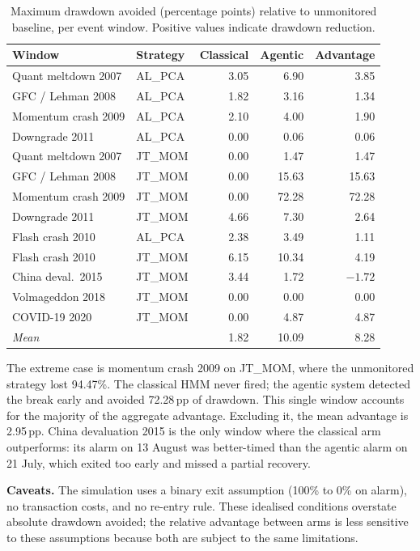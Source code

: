 \documentclass[11pt,a4paper]{article}
\begin{document}
\begin{table}[htbp]
\centering
\small
\caption{Maximum drawdown avoided (percentage points) relative to unmonitored
baseline, per event window. Positive values indicate drawdown reduction.}
\label{tab:pnl}
\begin{tabular}{llrrr}
\toprule
Window & Strategy & Classical & Agentic & Advantage \\
\midrule
Quant meltdown 2007  & AL\_PCA & 3.05 & 6.90 & 3.85 \\
GFC / Lehman 2008    & AL\_PCA & 1.82 & 3.16 & 1.34 \\
Momentum crash 2009  & AL\_PCA & 2.10 & 4.00 & 1.90 \\
Downgrade 2011       & AL\_PCA & 0.00 & 0.06 & 0.06 \\
\addlinespace
Quant meltdown 2007  & JT\_MOM & 0.00 & 1.47 & 1.47 \\
GFC / Lehman 2008    & JT\_MOM & 0.00 & 15.63 & 15.63 \\
Momentum crash 2009  & JT\_MOM & 0.00 & 72.28 & 72.28 \\
Downgrade 2011       & JT\_MOM & 4.66 & 7.30 & 2.64 \\
\addlinespace
Flash crash 2010     & AL\_PCA & 2.38 & 3.49 & 1.11 \\
Flash crash 2010     & JT\_MOM & 6.15 & 10.34 & 4.19 \\
China deval.\ 2015   & JT\_MOM & 3.44 & 1.72 & $-1.72$ \\
Volmageddon 2018     & JT\_MOM & 0.00 & 0.00 & 0.00 \\
COVID-19 2020        & JT\_MOM & 0.00 & 4.87 & 4.87 \\
\midrule
\multicolumn{2}{l}{\emph{Mean}} & 1.82 & 10.09 & 8.28 \\
\bottomrule
\end{tabular}
\end{table}

The extreme case is momentum crash 2009 on JT\_MOM, where the unmonitored
strategy lost 94.47\%. The classical HMM never fired; the agentic system
detected the break early and avoided 72.28\,pp of drawdown. This single
window accounts for the majority of the aggregate advantage. Excluding it,
the mean advantage is 2.95\,pp. China devaluation 2015 is the only window
where the classical arm outperforms: its alarm on 13 August was better-timed
than the agentic alarm on 21 July, which exited too early and missed a
partial recovery.

\textbf{Caveats.} The simulation uses a binary exit assumption (100\% to 0\%
on alarm), no transaction costs, and no re-entry rule. These idealised
conditions overstate absolute drawdown avoided; the relative advantage between
arms is less sensitive to these assumptions because both are subject to the
same limitations.
\end{document}

